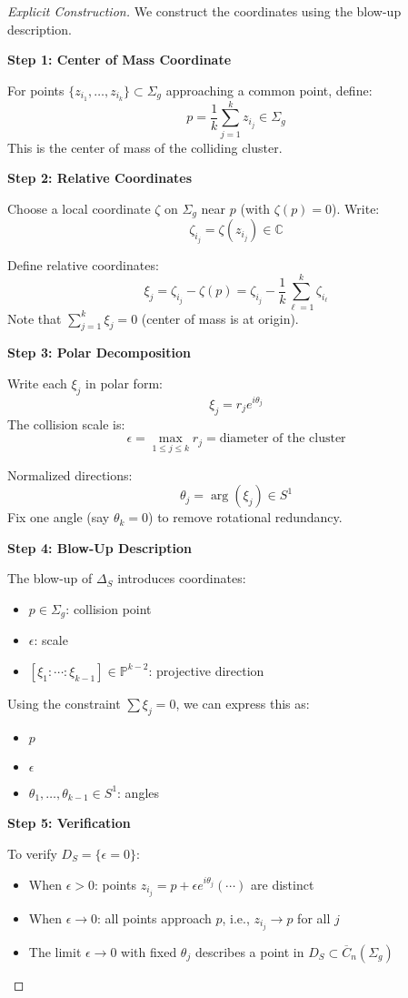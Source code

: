\begin{proof}[Explicit Construction]
We construct the coordinates using the blow-up description.

\medskip
\noindent\textbf{Step 1: Center of Mass Coordinate}

For points $\{z_{i_1}, \ldots, z_{i_k}\} \subset \Sigma_g$ approaching a common point, define:
$$p = \frac{1}{k}\sum_{j=1}^k z_{i_j} \in \Sigma_g$$
This is the center of mass of the colliding cluster.

\medskip
\noindent\textbf{Step 2: Relative Coordinates}

Choose a local coordinate $\zeta$ on $\Sigma_g$ near $p$ (with $\zeta(p) = 0$). Write:
$$\zeta_{i_j} = \zeta(z_{i_j}) \in \mathbb{C}$$

Define relative coordinates:
$$\xi_j = \zeta_{i_j} - \zeta(p) = \zeta_{i_j} - \frac{1}{k}\sum_{\ell=1}^k \zeta_{i_\ell}$$
Note that $\sum_{j=1}^k \xi_j = 0$ (center of mass is at origin).

\medskip
\noindent\textbf{Step 3: Polar Decomposition}

Write each $\xi_j$ in polar form:
$$\xi_j = r_j e^{i\theta_j}$$
The collision scale is:
$$\epsilon = \max_{1 \leq j \leq k} r_j = \text{diameter of the cluster}$$

Normalized directions:
$$\theta_j = \arg(\xi_j) \in S^1$$
Fix one angle (say $\theta_k = 0$) to remove rotational redundancy.

\medskip
\noindent\textbf{Step 4: Blow-Up Description}

The blow-up of $\Delta_S$ introduces coordinates:
\begin{itemize}
\item $p \in \Sigma_g$: collision point
\item $\epsilon$: scale
\item $[\xi_1 : \cdots : \xi_{k-1}] \in \mathbb{P}^{k-2}$: projective direction
\end{itemize}

Using the constraint $\sum \xi_j = 0$, we can express this as:
\begin{itemize}
\item $p$
\item $\epsilon$
\item $\theta_1, \ldots, \theta_{k-1} \in S^1$: angles
\end{itemize}

\medskip
\noindent\textbf{Step 5: Verification}

To verify $D_S = \{\epsilon = 0\}$:
\begin{itemize}
\item When $\epsilon > 0$: points $z_{i_j} = p + \epsilon e^{i\theta_j} (\cdots)$ are distinct
\item When $\epsilon \to 0$: all points approach $p$, i.e., $z_{i_j} \to p$ for all $j$
\item The limit $\epsilon \to 0$ with fixed $\theta_j$ describes a point in $D_S \subset \overline{C}_n(\Sigma_g)$
\end{itemize}
\end{proof}

